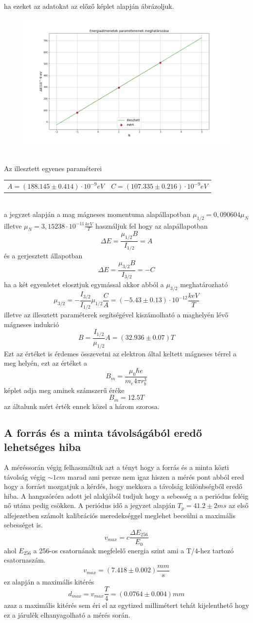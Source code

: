 \documentclass[a4paper,12pt]{article}
\numberwithin{equation}{subsection}
\begin{document}
\newpage
ha ezeket az adatokat az előző képlet alapján ábrázoljuk. 
\begin{figure}[h!]
\centering
\includegraphics[width=12cm]{parameterek.png}
\end{figure}
\\Az illesztett egyenes paraméterei 
\begin{table}[h!]
\centering
\begin{tabular}{c c}
$A=(188.145 \pm 0.414)\cdot 10^{-9} eV$ & $C=(107.335\pm0.216)\cdot 10^{-9}eV$
\end{tabular}
\end{table}
\\a jegyzet alapján a mag mágneses momentuma alapállapotban $\mu_{1/2}=0, 090604 \mu_N$ illetve $\mu_N=3, 15238\cdot 10^{-11} \frac{keV}{T}$ használjuk fel hogy az alapállapotban \[\Delta E=\frac{\mu_{1/2}B}{I_{1/2}}=A \] és a gerjesztett állapotban
\[\Delta E=\frac{\mu_{3/2}B}{I_{3/2}}=-C\]
ha a két egyenletet elosztjuk egymással akkor abból a $\mu_{3/2}$ meghatározható
\[\mu_{3/2}=-\frac{I_{3/2}}{I_{1/2}}\mu_{1/2}\frac{C}{A}=(-5.43\pm0.13)\cdot 10^{-12}\frac{keV}{T}\] illetve az illesztett paraméterek segítségével kiszámolható a maghelyén lévő mágneses indukció
\[B=\frac{I_{1/2}}{\mu_{1/2}}A=(32.936\pm0.07) T\]
Ezt az értéket is érdemes összevetni az elektron által keltett mágneses térrel a meg helyén, ezt az értéket a \[B_m=\frac{\mu_0\hbar e }{m_e 4 \pi r^3_b} \] képlet adja meg aminek számszerű éréke \[B_m=12.5T\] az általunk mért érték ennek közel a három szorosa.
\subsection{A forrás és a minta távolságából eredő lehetséges hiba}
A méréssorán végig felhasználtuk azt a tényt hogy a forrás és a minta közti távolság végig $\sim 1 cm$ marad ami persze nem igaz hiszen a mérés pont abból ered hogy a forrást mozgatjuk a kérdés, hogy mekkora a távolság különbségből eredő hiba. A hangszóróra adott jel alakjából tudjuk hogy a sebesség a a periódus feléig nő utána pedig csökken. A periódus idő a jegyzet alapján $T_p=41.2\pm2ms$ az első alfejezetben számolt kalibrációs meredekséggel meglehet becsülni a maximális sebességet is.  \[v_{max}=c\frac{\Delta E_{256}}{E_0}\] ahol $E_{256}$ a 256-os csatornának megfelelő energia szint ami a T/4-hez tartozó csatornaszám. \[v_{max}=(7.418\pm0.002)\frac{mm}{s}\] ez alapján a maximális kitérés \[d_{max}=v_{max}\frac{T}{4}=(0.0764\pm0.004) mm \] azaz a maximális kitérés sem éri el az egytized millimétert tehát kijelenthető hogy ez a járulék elhanyagolható a mérés során.
 
\end{document}
